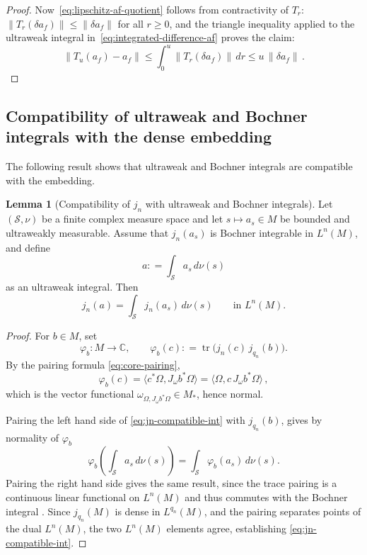 \documentclass[11pt,a4paper]{article}
\theoremstyle{plain}
\numberwithin{theorem}{section}
\theoremstyle{definition}
\newtheorem{lemma}[theorem]{Lemma}
\newcommand{\?}{\overset{?}{=}}
\newcommand{\defeq}{\mathrel{\mathop:}=}
\DeclareMathOperator{\tr}{tr}
\newcommand{\lb}{\left (}
\newcommand{\rb}{\right )}
\begin{document}
\begin{appendix}
\begin{proof}
Now~\eqref{eq:lipschitz-af-quotient} follows from
contractivity of $T_r$: $\|T_r(\delta a_f)\|\le\|\delta a_f\|$
for all $r\ge 0$, and the triangle inequality applied to the ultraweak integral
in~\eqref{eq:integrated-difference-af} proves the claim:
\begin{equation*}
  \|T_u(a_f)-a_f\|\le\int_0^u\|T_r(\delta a_f)\|\,dr\le u\,\|\delta a_f\|\,.
\end{equation*}
\end{proof}

\subsection{Compatibility of ultraweak and Bochner integrals with the dense embedding}

The following result shows that ultraweak and Bochner integrals are compatible with the embedding.
\begin{lemma}[Compatibility of $j_n$ with ultraweak and Bochner integrals]\label{lem:jn-compatible-weak}
Let $(\mathcal S,\nu)$ be a finite complex measure space and let $s\mapsto a_s \in M$ be bounded and ultraweakly measurable. Assume that $j_n(a_s)$ is Bochner integrable in $L^n(M)$, and define
\begin{equation}
    a \defeq \int_{\mathcal S} a_s \,d\nu(s)
\end{equation}
as an ultraweak integral. Then
\begin{equation} \label{eq:jn-compatible-int}
    j_n(a) = \int_{\mathcal S} j_n(a_s) \, d\nu(s) \qquad\text{in }L^n(M).
\end{equation}
\end{lemma}
\begin{proof}
For $b\in M$, set 
\begin{equation}
\label{eq:pairing-functional}
    \varphi_b:M\to\mathbb C,\qquad
    \varphi_b(c)\defeq \tr\bigl(j_n(c)\,j_{q_n}(b)\bigr).
\end{equation}
By the pairing formula \eqref{eq:core-pairing},
\begin{equation*}
    \varphi_b(c)=\langle c^*\Omega,J_\omega b^*\Omega\rangle=\langle\Omega,c\,J_\omega b^*\Omega\rangle\,,
\end{equation*}
which is the vector functional $\omega_{\Omega,J_\omega b^*\Omega}\in M_*$, hence normal.

Pairing the left hand side of \eqref{eq:jn-compatible-int} with $j_{q_n}(b)$, gives by normality of $\varphi_b$
\begin{equation*}
    \varphi_b \lb \int_{\mathcal S} a_s\, d\nu(s)\rb=\int_{\mathcal S} \varphi_b(a_s)\, d\nu(s). 
\end{equation*}
Pairing the right hand side gives the same result, since the trace pairing is a continuous linear functional on $L^n(M)$ and thus commutes with the Bochner integral \cite[Proposition C.4]{engel.nagel:00:one-parameter}.
Since $j_{q_n}(M)$ is dense in $L^{q_n}(M)$, and the pairing separates points of the dual $L^n(M)$, the two $L^n(M)$ elements agree,  establishing \eqref{eq:jn-compatible-int}. 
\end{proof}


\end{appendix}
\end{document}
